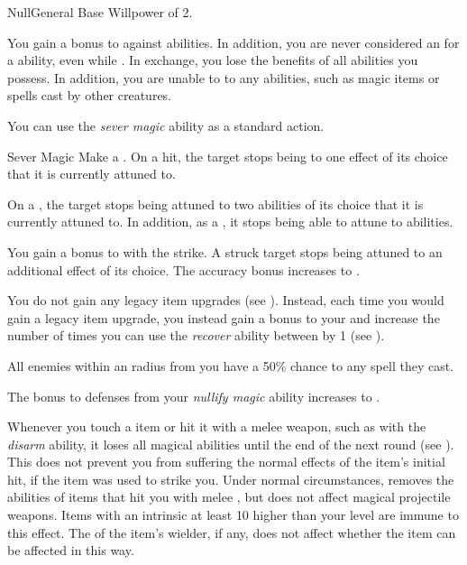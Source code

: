     \begin{feat}{Null}{General}
        \featpre Base Willpower of 2.

         You gain a  bonus to  against  abilities.
        In addition, you are never considered an  for a  ability, even while .
        In exchange, you lose the benefits of all  abilities you possess.
        In addition, you are unable to  to any  abilities, such as magic items or spells cast by other creatures.

         You can use the \textit{sever magic} ability as a standard action.
        \begin{freeability}{Sever Magic}
            Make a .
            On a hit, the target stops being  to one effect of its choice that it is currently attuned to.

            On a , the target stops being attuned to two abilities of its choice that it is currently attuned to.
            In addition, as a , it stops being able to attune to abilities.

            \rankline
             You gain a  bonus to  with the strike.
             A struck target stops being attuned to an additional effect of its choice.
             The accuracy bonus increases to .
        \end{freeability}

         You do not gain any legacy item upgrades (see ).
        Instead, each time you would gain a legacy item upgrade, you instead gain a  bonus to your  and increase the number of times you can use the \textit{recover} ability between  by 1 (see ).

         All enemies within an \areamed radius from you have a 50\% chance to  any spell they cast.

         The bonus to defenses from your \textit{nullify magic} ability increases to .

         Whenever you touch a  item or hit it with a melee weapon, such as with the \textit{disarm} ability, it loses all magical abilities until the end of the next round (see ).
        This does not prevent you from suffering the normal effects of the item's initial hit, if the item was used to strike you.
        Under normal circumstances, removes the abilities of items that hit you with melee , but does not affect magical projectile weapons.
        Items with an intrinsic  at least 10 higher than your level are immune to this effect.
        The  of the item's wielder, if any, does not affect whether the item can be affected in this way.


\end{feat}
